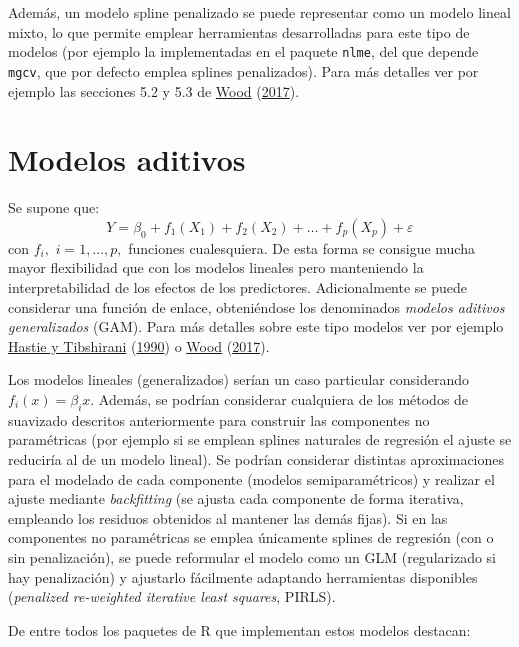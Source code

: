 \documentclass[
  spanish,
]{book}
\theoremstyle{break}
\theoremstyle{definition}
\theoremstyle{definition}
\theoremstyle{definition}
\theoremstyle{definition}
\theoremstyle{remark}
\begin{document}
Además, un modelo spline penalizado se puede representar como un modelo lineal mixto, lo que permite emplear herramientas desarrolladas para este tipo de modelos (por ejemplo la implementadas en el paquete \texttt{nlme}, del que depende \texttt{mgcv}, que por defecto emplea splines penalizados).
Para más detalles ver por ejemplo las secciones 5.2 y 5.3 de \protect\hyperlink{ref-wood2017generalized}{Wood} (\protect\hyperlink{ref-wood2017generalized}{2017}).

\hypertarget{modelos-aditivos}{%
\section{Modelos aditivos}\label{modelos-aditivos}}

Se supone que:
\[Y= \beta_{0} + f_1(X_1) + f_2(X_2) + \ldots + f_p(X_p)  + \varepsilon\]
con \(f_{i},\) \(i=1,...,p,\) funciones cualesquiera.
De esta forma se consigue mucha mayor flexibilidad que con los modelos lineales pero manteniendo la interpretabilidad de los efectos de los predictores.
Adicionalmente se puede considerar una función de enlace, obteniéndose los denominados \emph{modelos aditivos generalizados} (GAM). Para más detalles sobre este tipo modelos ver por ejemplo \protect\hyperlink{ref-hastie1990generalized}{Hastie y Tibshirani} (\protect\hyperlink{ref-hastie1990generalized}{1990}) o \protect\hyperlink{ref-wood2017generalized}{Wood} (\protect\hyperlink{ref-wood2017generalized}{2017}).

Los modelos lineales (generalizados) serían un caso particular considerando \(f_{i}(x) = \beta_{i}x\).
Además, se podrían considerar cualquiera de los métodos de suavizado descritos anteriormente para construir las componentes no paramétricas (por ejemplo si se emplean splines naturales de regresión el ajuste se reduciría al de un modelo lineal).
Se podrían considerar distintas aproximaciones para el modelado de cada componente (modelos semiparamétricos) y realizar el ajuste mediante \emph{backfitting} (se ajusta cada componente de forma iterativa, empleando los residuos obtenidos al mantener las demás fijas).
Si en las componentes no paramétricas se emplea únicamente splines de regresión (con o sin penalización), se puede reformular el modelo como un GLM (regularizado si hay penalización) y ajustarlo fácilmente adaptando herramientas disponibles (\emph{penalized re-weighted iterative least squares}, PIRLS).

De entre todos los paquetes de R que implementan estos modelos destacan:
\end{document}
